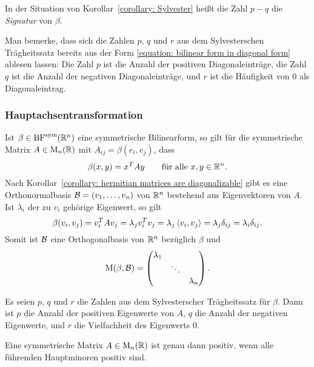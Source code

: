 \begin{definition}
  In der Situation von Korollar~\ref{corollary: Sylvester} heißt die Zahl $p - q$ die \emph{Signatur} von $\beta$.
\end{definition}

Man bemerke, dass sich die Zahlen $p$, $q$ und $r$ aus dem Sylvesterschen Trägheitssatz bereits aus der Form \eqref{equation: bilinear form in diagonal form} ablesen lassen:
Die Zahl $p$ ist die Anzahl der positiven Diagonaleinträge, die Zahl $q$ ist die Anzahl der negativen Diagonaleinträge, und $r$ ist die Häufigkeit von $0$ als Diagonaleintrag.



\subsubsection{Hauptachsentransformation}

Ist $\beta \in \operatorname{BF}^{\operatorname{sym}}(\mathbb{R}^n)$ eine symmetrische Bilinearform, so gilt für die symmetrische Matrix $A \in \operatorname{M}_{n}(\mathbb{R})$ mit $A_{ij} = \beta(e_i, e_j)$, dass
\[
    \beta(x,y)
  = x^T A y
  \qquad
  \text{für alle $x, y \in \mathbb{R}^n$}.
\]
Nach Korollar~\ref{corollary: hermitian matrices are diagonalizable} gibt es eine Orthonormalbasis $\mathcal{B} = (v_1, \dotsc, v_n)$ von $\mathbb{R}^n$ bestehend aus Eigenvektoren von $A$.
Ist $\lambda_i$ der zu $v_i$ gehörige Eigenwert, so gilt
\[
    \beta(v_i, v_j)
  = v_i^T A v_j
  = \lambda_j v_i^T v_j
  = \lambda_j \left\langle v_i, v_j \right\rangle
  = \lambda_j \delta_{ij}
  = \lambda_i \delta_{ij}.
\]
Somit ist $\mathcal{B}$ eine Orthogonalbasis von $\mathbb{R}^n$ bezüglich $\beta$ und
\[
    \operatorname{M}(\beta, \mathcal{B})
  = \begin{pmatrix}
      \lambda_1 &         &           \\
                & \ddots  &           \\
                &         & \lambda_n
    \end{pmatrix}.
\]

\begin{proposition}
  Es seien $p$, $q$ und $r$ die Zahlen aus dem Sylvesterscher Trägheitssatz für $\beta$.
  Dann ist $p$ die Anzahl der positiven Eigenwerte von $A$, $q$ die Anzahl der negativen Eigenwerte, und $r$ die Vielfachheit des Eigenwerts $0$.
\end{proposition}


\begin{lemma}[Hauptminorenkriterium]
  Eine symmetrische Matrix $A \in \operatorname{M}_{n}(\mathbb{R})$ ist genau dann positiv, wenn alle führenden Hauptminoren positiv sind.
\end{lemma}





